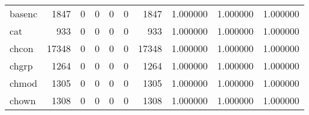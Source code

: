 \begin{tabular}{lrrrrrrrrr}
basenc    &                                1847 &                                               0 &                                              0 &                                             0 &                                              0 &                                         1847 &                                           1.000000 &                               1.000000 &                             1.000000 \\
cat       &                                 933 &                                               0 &                                              0 &                                             0 &                                              0 &                                          933 &                                           1.000000 &                               1.000000 &                             1.000000 \\
chcon     &                               17348 &                                               0 &                                              0 &                                             0 &                                              0 &                                        17348 &                                           1.000000 &                               1.000000 &                             1.000000 \\
chgrp     &                                1264 &                                               0 &                                              0 &                                             0 &                                              0 &                                         1264 &                                           1.000000 &                               1.000000 &                             1.000000 \\
chmod     &                                1305 &                                               0 &                                              0 &                                             0 &                                              0 &                                         1305 &                                           1.000000 &                               1.000000 &                             1.000000 \\
chown     &                                1308 &                                               0 &                                              0 &                                             0 &                                              0 &                                         1308 &                                           1.000000 &                               1.000000 &                             1.000000 \\

\end{tabular}
